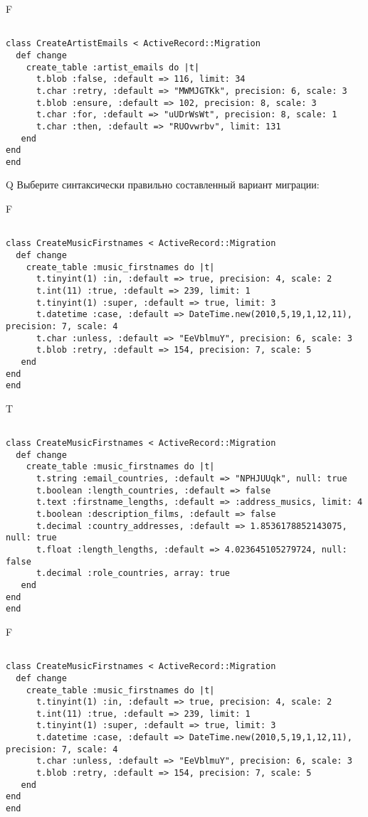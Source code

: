 F
\begin{verbatim}
		
class CreateArtistEmails < ActiveRecord::Migration 
  def change 
    create_table :artist_emails do |t| 
      t.blob :false, :default => 116, limit: 34
      t.char :retry, :default => "MWMJGTKk", precision: 6, scale: 3
      t.blob :ensure, :default => 102, precision: 8, scale: 3
      t.char :for, :default => "uUDrWsWt", precision: 8, scale: 1
      t.char :then, :default => "RUOvwrbv", limit: 131
   end
end
end
\end{verbatim}

Q
Выберите синтаксически правильно составленный вариант миграции:

F
\begin{verbatim}
		
class CreateMusicFirstnames < ActiveRecord::Migration 
  def change 
    create_table :music_firstnames do |t| 
      t.tinyint(1) :in, :default => true, precision: 4, scale: 2
      t.int(11) :true, :default => 239, limit: 1
      t.tinyint(1) :super, :default => true, limit: 3
      t.datetime :case, :default => DateTime.new(2010,5,19,1,12,11), precision: 7, scale: 4
      t.char :unless, :default => "EeVblmuY", precision: 6, scale: 3
      t.blob :retry, :default => 154, precision: 7, scale: 5
   end
end
end
\end{verbatim}

T
\begin{verbatim}
		
class CreateMusicFirstnames < ActiveRecord::Migration 
  def change 
    create_table :music_firstnames do |t| 
      t.string :email_countries, :default => "NPHJUUqk", null: true
      t.boolean :length_countries, :default => false
      t.text :firstname_lengths, :default => :address_musics, limit: 4
      t.boolean :description_films, :default => false
      t.decimal :country_addresses, :default => 1.8536178852143075, null: true
      t.float :length_lengths, :default => 4.023645105279724, null: false
      t.decimal :role_countries, array: true
   end
end
end
\end{verbatim}

F
\begin{verbatim}
		
class CreateMusicFirstnames < ActiveRecord::Migration 
  def change 
    create_table :music_firstnames do |t| 
      t.tinyint(1) :in, :default => true, precision: 4, scale: 2
      t.int(11) :true, :default => 239, limit: 1
      t.tinyint(1) :super, :default => true, limit: 3
      t.datetime :case, :default => DateTime.new(2010,5,19,1,12,11), precision: 7, scale: 4
      t.char :unless, :default => "EeVblmuY", precision: 6, scale: 3
      t.blob :retry, :default => 154, precision: 7, scale: 5
   end
end
end
\end{verbatim}

